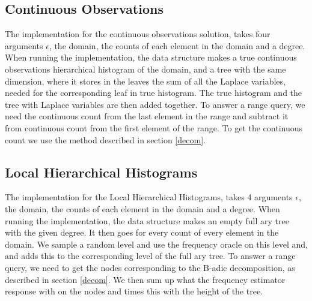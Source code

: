 \documentclass[11pt]{article}
\theoremstyle{definition}
\begin{document}
\subsection{Continuous Observations}
The implementation for the continuous observations solution, takes four arguments $\epsilon$, the domain, the counts of each element in the domain and a degree. 
When running the implementation, the data structure makes a true continuous observations hierarchical histogram of the domain, and a tree with the same dimension, where it stores in the leaves the sum of all the Laplace variables, needed for the corresponding leaf in true histogram. The true histogram and the tree with Laplace variables are then added together. To answer a range query, we need the continuous count from the last element in the range and subtract it from continuous count from the first element of the range. To get the continuous count we use the method described in section \ref{decom}. 

\subsection{Local Hierarchical Histograms}
The implementation for the Local Hierarchical Histograms, takes 4 arguments $\epsilon$, the domain, the counts of each element in the domain and a degree. 
When running the implementation, the data structure makes an empty full ary tree with the given degree. It then goes for every count of every element in the domain. We sample a random level and use the frequency oracle on this level and, and adds this to the corresponding level of the full ary tree. To answer a range query, we need to get the nodes corresponding to the B-adic decomposition, as described in section \ref{decom}. We then sum up what the frequency estimator response with on the nodes and times this with the height of the tree.
\end{document}
